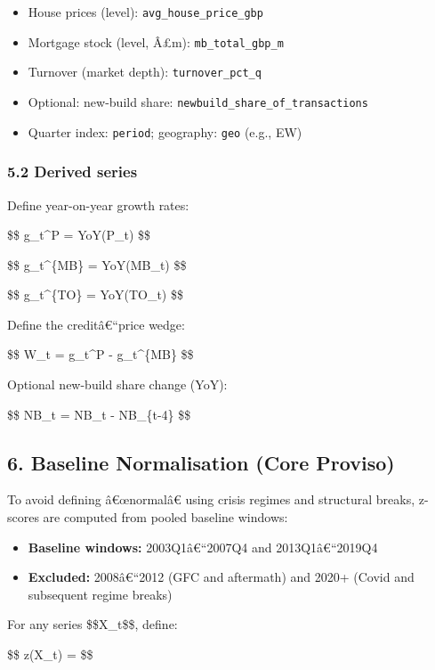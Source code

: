 \begin{itemize}
\tightlist
\item
  House prices (level): \texttt{avg\_house\_price\_gbp}
\item
  Mortgage stock (level, Â£m): \texttt{mb\_total\_gbp\_m}
\item
  Turnover (market depth): \texttt{turnover\_pct\_q}
\item
  Optional: new-build share: \texttt{newbuild\_share\_of\_transactions}
\item
  Quarter index: \texttt{period}; geography: \texttt{geo} (e.g., EW)
\end{itemize}

\subsubsection{5.2 Derived series}\label{derived-series}

Define year-on-year growth rates:

\$\$ g\_t\^{}P = YoY(P\_t) \$\$

\$\$ g\_t\^{}\{MB\} = YoY(MB\_t) \$\$

\$\$ g\_t\^{}\{TO\} = YoY(TO\_t) \$\$

Define the creditâ€``price wedge:

\$\$ W\_t = g\_t\^{}P - g\_t\^{}\{MB\} \$\$

Optional new-build share change (YoY):

\$\$ \Delta NB\_t = NB\_t - NB\_\{t-4\} \$\$

\subsection{6. Baseline Normalisation (Core
Proviso)}\label{baseline-normalisation-core-proviso}

To avoid defining â€œnormalâ€ using crisis regimes and structural
breaks, z-scores are computed from pooled baseline windows:

\begin{itemize}
\tightlist
\item
  \textbf{Baseline windows:} 2003Q1â€``2007Q4 and 2013Q1â€``2019Q4
\item
  \textbf{Excluded:} 2008â€``2012 (GFC and aftermath) and 2020+ (Covid
  and subsequent regime breaks)
\end{itemize}

For any series \$\$X\_t\$\$, define:

\$\$ z(X\_t) =  \$\$

